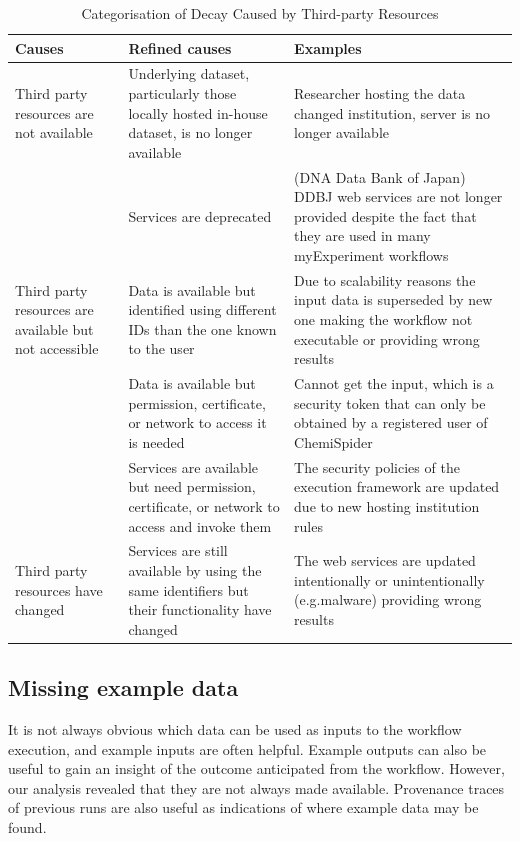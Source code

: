 \begin{table}[ht]
\caption{Categorisation of Decay Caused by Third-party Resources} %
\centering  %
\begin{tabular}{p{1.6in} p{2.2in} p{2.2in}} %
\hline\hline                        %
Causes &  Refined causes & Examples \\
\hline                  

Third party resources are not available & Underlying dataset, particularly those locally hosted in-house dataset, is no longer available & Researcher hosting the data changed institution, server is no longer available
\\ \cline{2-3}
			 									& Services are deprecated & (DNA Data Bank of Japan) DDBJ web services are not longer provided despite the fact that they are used in many myExperiment workflows
 \\ \hline

Third party resources are available but not accessible & Data is available but identified using different IDs than the one known to the user & Due to scalability reasons the input data is superseded by new one making the workflow not executable or providing wrong results
\\ \cline{2-3}

								& Data is available but permission, certificate, or network to access it is needed & Cannot get the input, which is a security token that can only be obtained by a registered user of ChemiSpider
\\ \cline{2-3}
								& Services are available but need permission, certificate, or network to access and invoke them	& The security policies of the execution framework are updated due to new hosting institution rules \\
\hline
Third party resources have changed &  Services are still available by using the same identifiers but their functionality have changed & The web services are updated intentionally or unintentionally (e.g.malware) providing wrong results \\
\hline
\end{tabular}
\label{table:decay} %
\end{table}

\subsection{Missing example data}
It is not always obvious which data can be used as inputs to the workflow execution, and example inputs are often helpful.  Example outputs can also be useful to gain an insight of the outcome anticipated from the workflow. However, our analysis revealed that they are not always made available. Provenance traces of previous runs are also useful as indications of where example data may be found.


